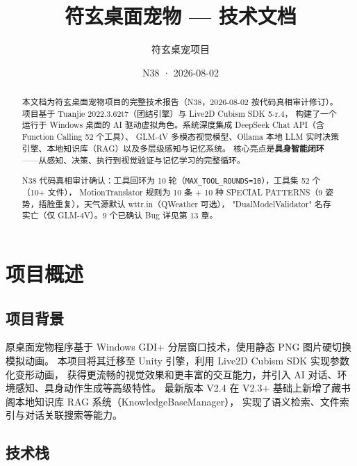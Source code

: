 \documentclass[12pt,a4paper]{ctexart}
\title{\vspace{-2cm}符玄桌面宠物 --- 技术文档}
\author{符玄桌宠项目}
\date{N38 · 2026-08-02}
\begin{document}
\maketitle
\thispagestyle{empty}

\begin{abstract}
本文档为符玄桌面宠物项目的完整技术报告（N38，2026-08-02 按代码真相审计修订）。项目基于 Tuanjie 2022.3.62t7（团结引擎）与 Live2D Cubism SDK 5-r.4，
构建了一个运行于 Windows 桌面的 AI 驱动虚拟角色。系统深度集成 DeepSeek Chat API（含 Function Calling 52 个工具）、
GLM-4V 多模态视觉模型、Ollama 本地 LLM 实时决策引擎、本地知识库（RAG）以及多层级感知与记忆系统。
核心亮点是\textbf{具身智能闭环}——从感知、决策、执行到视觉验证与记忆学习的完整循环。

N38 代码真相审计确认：工具回环为 10 轮（\texttt{MAX\_TOOL\_ROUNDS=10}），工具集 52 个（10+ 文件），
MotionTranslator 规则为 10 条 + 10 种 SPECIAL PATTERNS（9 姿势，捂脸重复），天气源默认 wttr.in（QWeather 可选），
"DualModelValidator" 名存实亡（仅 GLM-4V）。9 个已确认 Bug 详见第 13 章。
\end{abstract}

\tableofcontents
\newpage

\section{项目概述}

\subsection{项目背景}

原桌面宠物程序基于 Windows GDI+ 分层窗口技术，使用静态 PNG 图片硬切换模拟动画。
本项目将其迁移至 Unity 引擎，利用 Live2D Cubism SDK 实现参数化变形动画，
获得更流畅的视觉效果和更丰富的交互能力，并引入 AI 对话、环境感知、具身动作生成等高级特性。
最新版本 V2.4 在 V2.3+ 基础上新增了藏书阁本地知识库 RAG 系统（KnowledgeBaseManager），
实现了语义检索、文件索引与对话关联搜索等能力。

\subsection{技术栈}
\end{document}

